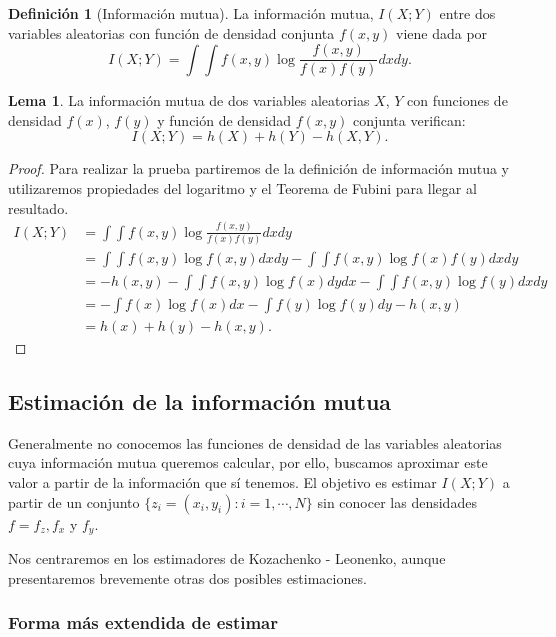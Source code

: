 \documentclass[10pt,a4paper]{article} %
\theoremstyle{definition}
\newtheorem{definition}{Definición}[section]
\newtheorem{lemma}[theorem]{Lema}
\begin{document}
\begin{definition}[Información mutua]
  La información mutua, $I(X;Y)$ entre dos variables aleatorias con función de densidad conjunta $f(x,y)$ viene dada por\[
I(X;Y) = \int \int f(x,y) \log \frac{f(x,y)}{f(x)f(y)}dxdy.
  \]
\end{definition}

\begin{lemma}\label{l:ent_im}
  La información mutua de dos variables aleatorias $X$, $Y$ con funciones de densidad $f(x)$, $f(y)$ y función de densidad $f(x,y)$ conjunta verifican:\[
  I(X;Y) = h(X) + h(Y) - h(X,Y).
  \]
\end{lemma}

\begin{proof}
  Para realizar la prueba partiremos de la definición de información mutua y utilizaremos propiedades del logaritmo y el Teorema de Fubini para llegar al resultado.
  \begin{align*}
    I(X;Y) &= \int \int f(x,y) \log \frac{f(x,y)}{f(x)f(y)}dxdy \\
    &= \int \int f(x,y) \log f(x,y)dxdy - \int \int f(x,y) \log f(x)f(y)dxdy\\
    &= -h(x,y)-\int\int f(x,y) \log f(x) dy dx - \int \int f(x,y)\log f(y)dxdy\\
    &= -\int f(x) \log f(x)dx - \int f(y)\log f(y) dy -h(x,y)\\
    &= h(x) + h(y) - h(x,y).
  \end{align*}
\end{proof}

\subsection{Estimación de la información mutua}

Generalmente no conocemos las funciones de densidad de las variables aleatorias cuya información mutua queremos calcular, por ello, buscamos aproximar este valor a partir de la información que sí tenemos. El objetivo es estimar $I(X;Y)$ a partir de un conjunto $\{z_i=(x_i,y_i) : i = 1,\cdots, N\}$ sin conocer las densidades $f=f_z, f_x$ y $f_y$.

Nos centraremos en los estimadores de Kozachenko - Leonenko, aunque presentaremos brevemente otras dos posibles estimaciones.

\subsubsection{Forma más extendida de estimar}
\end{document}
